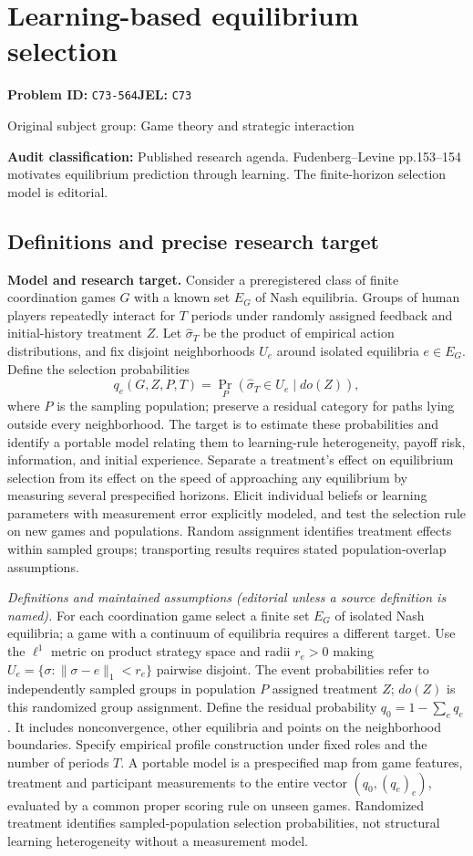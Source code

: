 \documentclass[11pt,a4paper]{article}
\begin{document}
\section*{Learning-based equilibrium selection}
\textbf{Problem ID:} \texttt{C73-564}\quad \textbf{JEL:} \texttt{C73}\par
\label{problem:OP-0281}
{\sffamily\small\color{muted}Original subject group: Game theory and strategic interaction\par}
\label{definitions:problem:30007563}
\textbf{Audit classification:} Published research agenda. Fudenberg–Levine pp.153–154 motivates equilibrium prediction through learning. The finite-horizon selection model is editorial.
\subsection*{Definitions and precise research target}
\textbf{Model and research target.} Consider a preregistered class of finite coordination games \(G\) with a known set \(E_G\) of Nash equilibria. Groups of human players repeatedly interact for \(T\) periods under randomly assigned feedback and initial-history treatment \(Z\). Let \(\widehat\sigma_T\) be the product of empirical action distributions, and fix disjoint neighborhoods \(U_e\) around isolated equilibria \(e\in E_G\). Define the selection probabilities
\[
 q_e(G,Z,P,T)=\Pr_P(\widehat\sigma_T\in U_e\mid do(Z)),
\]
where \(P\) is the sampling population; preserve a residual category for paths lying outside every neighborhood. The target is to estimate these probabilities and identify a portable model relating them to learning-rule heterogeneity, payoff risk, information, and initial experience. Separate a treatment's effect on equilibrium selection from its effect on the speed of approaching any equilibrium by measuring several prespecified horizons. Elicit individual beliefs or learning parameters with measurement error explicitly modeled, and test the selection rule on new games and populations. Random assignment identifies treatment effects within sampled groups; transporting results requires stated population-overlap assumptions.

\emph{Definitions and maintained assumptions (editorial unless a source definition is named).} For each coordination game select a finite set \(E_G\) of isolated Nash equilibria; a game with a continuum of equilibria requires a different target. Use the \(\ell^1\) metric on product strategy space and radii \(r_e>0\) making \(U_e=\{\sigma:\|\sigma-e\|_1<r_e\}\) pairwise disjoint. The event probabilities refer to independently sampled groups in population \(P\) assigned treatment \(Z\); \(do(Z)\) is this randomized group assignment. Define the residual probability \(q_0=1-\sum_e q_e\). It includes nonconvergence, other equilibria and points on the neighborhood boundaries. Specify empirical profile construction under fixed roles and the number of periods \(T\). A portable model is a prespecified map from game features, treatment and participant measurements to the entire vector \((q_0,(q_e)_e)\), evaluated by a common proper scoring rule on unseen games. Randomized treatment identifies sampled-population selection probabilities, not structural learning heterogeneity without a measurement model.
\end{document}
